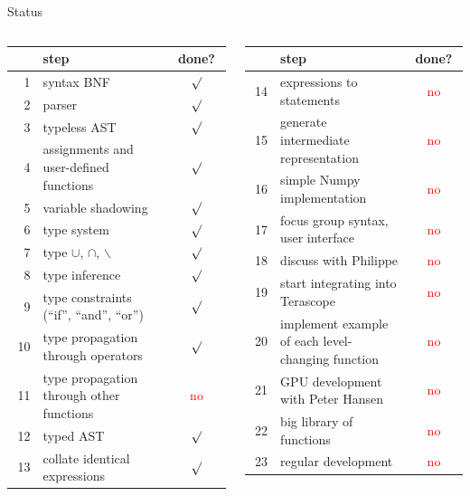 \documentclass{beamer}
\begin{document}
\begin{frame}{Status}
\vspace{0.25 cm}
\small
\begin{columns}[t]
\begin{tabular}{r >{\raggedright}p{0.6\linewidth} c}
& step & done? \\\hline
1 & syntax BNF & $\surd$ \\
2 & parser & $\surd$ \\
3 & typeless AST & $\surd$ \\
4 & assignments and user-defined functions & $\surd$ \\
5 & variable shadowing & $\surd$ \\
6 & type system & $\surd$ \\
7 & type $\cup$, $\cap$, $\backslash$ & $\surd$ \\
8 & type inference & $\surd$ \\
9 & type constraints (``if'', ``and'', ``or'') & $\surd$ \\
10 & type propagation through operators & $\surd$ \\
11 & type propagation through other functions & \textcolor{red}{no} \\
12 & typed AST & $\surd$ \\
13 & collate identical expressions & $\surd$ \\
\end{tabular}

\begin{tabular}{r >{\raggedright}p{0.6\linewidth} c}
& step & done? \\\hline
14 & expressions to statements & \textcolor{red}{no} \\
15 & generate intermediate representation & \textcolor{red}{no} \\
16 & simple Numpy implementation & \textcolor{red}{no} \\
17 & focus group syntax, user interface & \textcolor{red}{no} \\
18 & discuss with Philippe & \textcolor{red}{no} \\
19 & start integrating into Terascope & \textcolor{red}{no} \\
20 & implement example of each level-changing function & \textcolor{red}{no} \\
21 & GPU development with Peter Hansen & \textcolor{red}{no} \\
22 & big library of functions & \textcolor{red}{no} \\
23 & regular development & \textcolor{red}{no} \\
\end{tabular}
\end{columns}
\end{frame}
\end{document}
